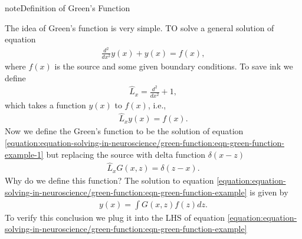 \documentclass[letterpaper,10pt,english]{sphinxmanual}
\begin{document}
\begin{sphinxadmonition}{note}{Definition of Green’s Function}

The idea of Green’s function is very simple. TO solve a general solution of equation
\label{\detokenize{equation-solving-in-neuroscience/green-function:equation-eqn-green-function-example}}\begin{equation}\label{equation:equation-solving-in-neuroscience/green-function:eqn-green-function-example}
\begin{split}\frac{d^2}{d x^2} y(x) + y(x) = f(x),\end{split}
\end{equation}
where \(f(x)\) is the source and some given boundary conditions. To save ink we define
\begin{equation*}
\begin{split}\hat L_x = \frac{d^2}{dx^2} + 1,\end{split}
\end{equation*}
which takes a function \(y(x)\) to \(f(x)\), i.e.,
\label{\detokenize{equation-solving-in-neuroscience/green-function:equation-eqn-green-function-example-1}}\begin{equation}\label{equation:equation-solving-in-neuroscience/green-function:eqn-green-function-example-1}
\begin{split}\hat L_x y(x) = f(x).\end{split}
\end{equation}
Now we define the Green’s function to be the solution of equation \eqref{equation:equation-solving-in-neuroscience/green-function:eqn-green-function-example-1} but replacing the source with delta function \(\delta(x-z)\)
\begin{equation*}
\begin{split}\hat L_x G(x,z) = \delta(z-x).\end{split}
\end{equation*}
Why do we define this function? The solution to equation \eqref{equation:equation-solving-in-neuroscience/green-function:eqn-green-function-example} is given by
\begin{equation*}
\begin{split}y(x) = \int G(x,z) f(z) dz.\end{split}
\end{equation*}
To verify this conclusion we plug it into the LHS of equation \eqref{equation:equation-solving-in-neuroscience/green-function:eqn-green-function-example}
\begin{equation*}

\end{equation*}
\end{sphinxadmonition}
\end{document}

